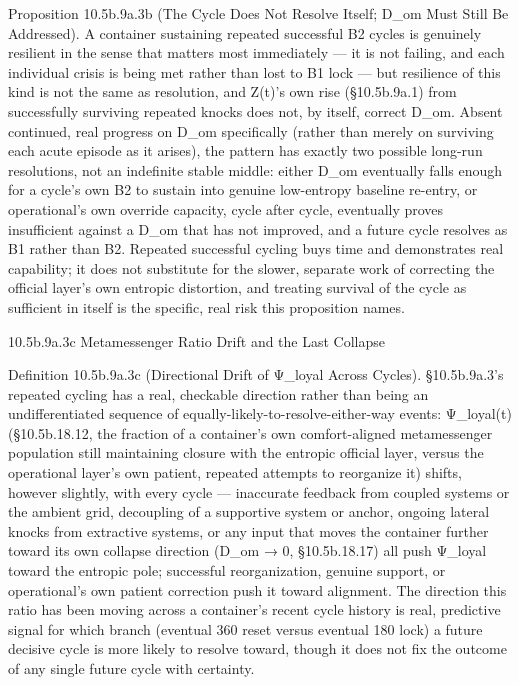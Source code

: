 \documentclass[
]{article}
\begin{document}
Proposition 10.5b.9a.3b (The Cycle Does Not Resolve Itself; D\_om Must
Still Be Addressed). A container sustaining repeated successful B2
cycles is genuinely resilient in the sense that matters most immediately
--- it is not failing, and each individual crisis is being met rather
than lost to B1 lock --- but resilience of this kind is not the same as
resolution, and Z(t)'s own rise (§10.5b.9a.1) from successfully
surviving repeated knocks does not, by itself, correct D\_om. Absent
continued, real progress on D\_om specifically (rather than merely on
surviving each acute episode as it arises), the pattern has exactly two
possible long-run resolutions, not an indefinite stable middle: either
D\_om eventually falls enough for a cycle's own B2 to sustain into
genuine low-entropy baseline re-entry, or operational's own override
capacity, cycle after cycle, eventually proves insufficient against a
D\_om that has not improved, and a future cycle resolves as B1 rather
than B2. Repeated successful cycling buys time and demonstrates real
capability; it does not substitute for the slower, separate work of
correcting the official layer's own entropic distortion, and treating
survival of the cycle as sufficient in itself is the specific, real risk
this proposition names.

10.5b.9a.3c Metamessenger Ratio Drift and the Last Collapse

Definition 10.5b.9a.3c (Directional Drift of Ψ\_loyal Across Cycles).
§10.5b.9a.3's repeated cycling has a real, checkable direction rather
than being an undifferentiated sequence of
equally-likely-to-resolve-either-way events: Ψ\_loyal(t) (§10.5b.18.12,
the fraction of a container's own comfort-aligned metamessenger
population still maintaining closure with the entropic official layer,
versus the operational layer's own patient, repeated attempts to
reorganize it) shifts, however slightly, with every cycle --- inaccurate
feedback from coupled systems or the ambient grid, decoupling of a
supportive system or anchor, ongoing lateral knocks from extractive
systems, or any input that moves the container further toward its own
collapse direction (D\_om → 0, §10.5b.18.17) all push Ψ\_loyal toward
the entropic pole; successful reorganization, genuine support, or
operational's own patient correction push it toward alignment. The
direction this ratio has been moving across a container's recent cycle
history is real, predictive signal for which branch (eventual 360 reset
versus eventual 180 lock) a future decisive cycle is more likely to
resolve toward, though it does not fix the outcome of any single future
cycle with certainty.
\end{document}
